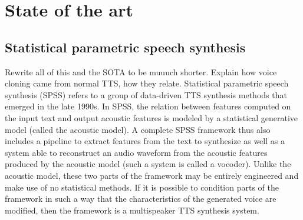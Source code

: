 \documentclass[a4paper, oneside, 12pt, english]{article}
\begin{document}
%
%


\section{State of the art}

\subsection{Statistical parametric speech synthesis}
\color{red} Rewrite all of this and the SOTA to be muuuch shorter. Explain how voice cloning came from normal TTS, how they relate. \color{black}
Statistical parametric speech synthesis (SPSS) refers to a group of data-driven TTS synthesis methods that emerged in the late 1990s. In SPSS, the relation between features computed on the input text and output acoustic features is modeled by a statistical generative model (called the acoustic model). A complete SPSS framework thus also includes a pipeline to extract features from the text to synthesize as well as a system able to reconstruct an audio waveform from the acoustic features produced by the acoustic model (such a system is called a vocoder). Unlike the acoustic model, these two parts of the framework may be entirely engineered and make use of no statistical methods. If it is possible to condition parts of the framework in such a way that the characteristics of the generated voice are modified, then the framework is a multispeaker TTS synthesis system.
\end{document}
